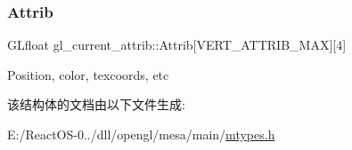 \subsubsection{\texorpdfstring{Attrib}{Attrib}}
{\footnotesize\ttfamily G\+Lfloat gl\+\_\+current\+\_\+attrib\+::\+Attrib\mbox{[}V\+E\+R\+T\+\_\+\+A\+T\+T\+R\+I\+B\+\_\+\+M\+AX\mbox{]}\mbox{[}4\mbox{]}}

Position, color, texcoords, etc 

该结构体的文档由以下文件生成\+:\begin{DoxyCompactItemize}
\item 
E\+:/\+React\+O\+S-\/0../dll/opengl/mesa/main/\hyperlink{mtypes_8h}{mtypes.\+h}\end{DoxyCompactItemize}
